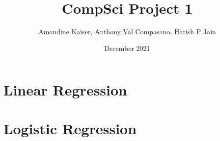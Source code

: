 \documentclass{article}
\title{CompSci Project 1}
\author{Amandine Kaiser, Anthony Val Compasano, Harish P Jain}
\date{December 2021}
\begin{document}
\setlength{\parindent}{0em} 
\maketitle
\newpage

\tableofcontents
\newpage


\section{Linear Regression} \label{sec:linear_regression}




\section{Logistic Regression} \label{sec:logistic_regression}






\newpage
 

\end{document}
